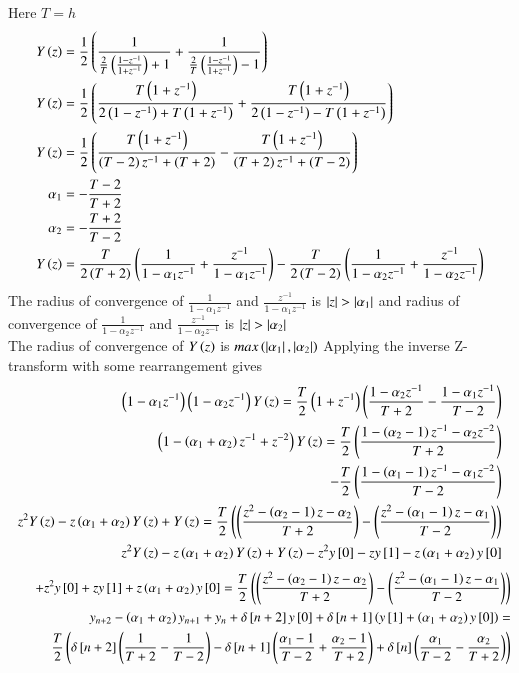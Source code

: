 \documentclass[journal]{IEEEtran}
\begin{document}
Here $T = h$
\begin{align}
	Y\left(z\right) &= \frac{1}{2}\left(\frac{1}{\frac{2}{T}\left(\frac{1-z^{-1}}{1+z^{-1}}\right)+1}+\frac{1}{\frac{2}{T}\left(\frac{1-z^{-1}}{1+z^{-1}}\right)-1}\right)\\
	Y\left(z\right) &= \frac{1}{2}\left(\frac{T\left(1+z^{-1}\right)}{2\left(1-z^{-1}\right)+T\left(1+z^{-1}\right)}+\frac{T\left(1+z^{-1}\right)}{2\left(1-z^{-1}\right)-T\left(1+z^{-1}\right)}\right)\\
	Y\left(z\right) &= \frac{1}{2}\left(\frac{T\left(1+z^{-1}\right)}{\left(T-2\right)z^{-1}+\left(T+2\right)} - \frac{T\left(1+z^{-1}\right)}{\left(T+2\right)z^{-1}+\left(T-2\right)}\right)\\
	\alpha_1 &= -\frac{T-2}{T+2}\\
	\alpha_2 &= -\frac{T+2}{T-2}\\ 
	Y\left(z\right) &= \frac{T}{2\left(T+2\right)}\left(\frac{1}{1-\alpha_1z^{-1}}+\frac{z^{-1}}{1-\alpha_1z^{-1}}\right)-\frac{T}{2\left(T-2\right)}\left(\frac{1}{1-\alpha_2z^{-1}}+\frac{z^{-1}}{1-\alpha_2z^{-1}}\right)
\end{align}
The radius of convergence of $\frac{1}{1-\alpha_1z^{-1}}$ and $\frac{z^{-1}}{1-\alpha_1z^{-1}}$ is $\left\vert z\right\vert>\left\vert\alpha_1\right\vert$ and radius of convergence of $\frac{1}{1-\alpha_2z^{-1}}$ and $\frac{z^{-1}}{1-\alpha_2z^{-1}}$ is $\left\vert z\right\vert>\left\vert\alpha_2\right\vert$\\
The radius of convergence of $Y\left(z\right)$ is $max\left(\left\vert\alpha_1\right\vert,\left\vert\alpha_2\right\vert\right)$\newline
Applying the inverse Z-transform with some rearrangement gives
\begin{align}
	\left(1-\alpha_1z^{-1}\right)\left(1-\alpha_2z^{-1}\right)Y\left(z\right) = \frac{T}{2}\left(1+z^{-1}\right)\left(\frac{1-\alpha_2z^{-1}}{T+2}-\frac{1-\alpha_1z^{-1}}{T-2}\right)\\
	\left(1-\left(\alpha_1+\alpha_2\right)z^{-1}+z^{-2}\right)Y\left(z\right) = \frac{T}{2}\left(\frac{1-\left(\alpha_2-1\right)z^{-1}-\alpha_2z^{-2}}{T+2}\right)\nonumber \\
  \qquad -\frac{T}{2}\left(\frac{1-\left(\alpha_1-1\right)z^{-1}-\alpha_1z^{-2}}{T-2}\right)\\
	z^2Y\left(z\right)-z\left(\alpha_1+\alpha_2\right)Y\left(z\right)+Y\left(z\right) = \frac{T}{2}\left(\left(\frac{z^2-\left(\alpha_2-1\right)z-\alpha_2}{T+2}\right)-\left(\frac{z^2-\left(\alpha_1-1\right)z-\alpha_1}{T-2}\right)\right)\\
	z^2Y\left(z\right)-z\left(\alpha_1+\alpha_2\right)Y\left(z\right)+Y\left(z\right) -z^2y{}\left[0\right] -zy{}\left[1\right] -z\left(\alpha_1+\alpha_2\right)y{}\left[0\right]\nonumber
\end{align}
\begin{align}
  \qquad+z^2y{}\left[0\right]+zy{}\left[1\right]+z\left(\alpha_1+\alpha_2\right)y{}\left[0\right] = \frac{T}{2}\left(\left(\frac{z^2-\left(\alpha_2-1\right)z-\alpha_2}{T+2}\right)-\left(\frac{z^2-\left(\alpha_1-1\right)z-\alpha_1}{T-2}\right)\right)\\
  y_{n+2}-\left(\alpha_1+\alpha_2\right)y_{n+1}+y_n+\delta{}\left[n+2\right]y{}\left[0\right]+\delta{}\left[n+1\right]\left(y{}\left[1\right]+\left(\alpha_1+\alpha_2\right)y{}\left[0\right]\right) = \nonumber \\
  \qquad\frac{T}{2}\left(\delta{}\left[n+2\right]\left(\frac{1}{T+2}-\frac{1}{T-2}\right)-\delta{}\left[n+1\right]\left(\frac{\alpha_1-1}{T-2}+\frac{\alpha_2-1}{T+2}\right)+\delta{}\left[n\right]\left(\frac{\alpha_1}{T-2}-\frac{\alpha_2}{T+2}\right)\right)
\end{align}
\end{document}
